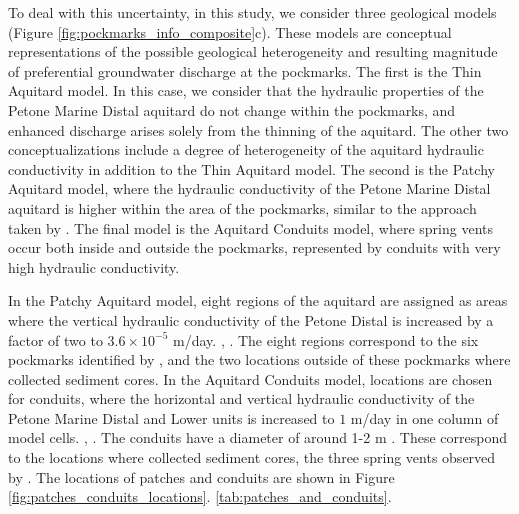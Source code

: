 \documentclass[draft, 10pt]{agujournal2019}
\begin{document}
To deal with this uncertainty, in this study, we consider three geological models (Figure \ref{fig:pockmarks_info_composite}c). These models are conceptual representations of the possible geological heterogeneity and resulting magnitude of preferential groundwater discharge at the pockmarks. The first is the Thin Aquitard model. In this case, we consider that the hydraulic properties of the Petone Marine Distal aquitard do not change within the pockmarks, and enhanced discharge arises solely from the thinning of the aquitard. The other two conceptualizations include a degree of heterogeneity of the aquitard hydraulic conductivity in addition to the Thin Aquitard model. The second is the Patchy Aquitard model, where the hydraulic conductivity of the Petone Marine Distal aquitard is higher within the area of the pockmarks, similar to the approach taken by . The final model is the Aquitard Conduits model, where spring vents occur both inside and outside the pockmarks, represented by conduits with very high hydraulic conductivity.

In the Patchy Aquitard model, eight regions of the aquitard are assigned as areas where the vertical hydraulic conductivity of the Petone Distal is increased by a factor of two to $3.6 \times 10^{-5}$ m/day.  \cite{bennett_hutt_2024}, .  The eight regions correspond to the six pockmarks identified by , and the two locations outside of these pockmarks where  collected sediment cores. 
In the Aquitard Conduits model,  locations are chosen for conduits, where the horizontal and vertical hydraulic conductivity of the Petone Marine Distal and Lower units is increased to $1$ m/day in one column of model cells.  \cite{zhu_experimental_2021},  \cite{hoffmann_fresh_2023, harding_characteristics_2000}. The conduits have a diameter of around 1-2 m \cite{harding_characteristics_2000}. These correspond to the locations where  collected sediment cores, the three spring vents observed by  . 
The locations of patches and conduits are shown in Figure \ref{fig:patches_conduits_locations}.
\ref{tab:patches_and_conduits}.
\end{document}
